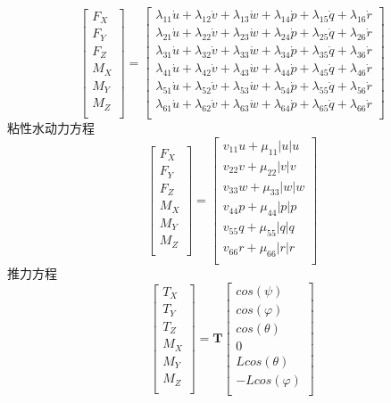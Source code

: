 \documentclass{ctexart}
\begin{document}
	\[
	\begin{bmatrix}
		F_X\\
		F_Y\\
		F_Z\\
		M_X\\
		M_Y\\
		M_Z\\
	\end{bmatrix}=
	\begin{bmatrix}
		\lambda_{11}\dot{u}+\lambda_{12}\dot{v}+\lambda_{13}\dot{w}+\lambda_{14}\dot{p}+\lambda_{15}\dot{q}+\lambda_{16}\dot{r}\\
		\lambda_{21}\dot{u}+\lambda_{22}\dot{v}+\lambda_{23}\dot{w}+\lambda_{24}\dot{p}+\lambda_{25}\dot{q}+\lambda_{26}\dot{r}\\
		\lambda_{31}\dot{u}+\lambda_{32}\dot{v}+\lambda_{33}\dot{w}+\lambda_{34}\dot{p}+\lambda_{35}\dot{q}+\lambda_{36}\dot{r}\\
		\lambda_{41}\dot{u}+\lambda_{42}\dot{v}+\lambda_{43}\dot{w}+\lambda_{44}\dot{p}+\lambda_{45}\dot{q}+\lambda_{46}\dot{r}\\
		\lambda_{51}\dot{u}+\lambda_{52}\dot{v}+\lambda_{53}\dot{w}+\lambda_{54}\dot{p}+\lambda_{55}\dot{q}+\lambda_{56}\dot{r}\\	
		\lambda_{61}\dot{u}+\lambda_{62}\dot{v}+\lambda_{63}\dot{w}+\lambda_{64}\dot{p}+\lambda_{65}\dot{q}+\lambda_{66}\dot{r}\\
	\end{bmatrix}
	\]
	粘性水动力方程
	\[
		\begin{bmatrix}
			F_X\\
			F_Y\\
			F_Z\\
			M_X\\
			M_Y\\
			M_Z\\
		\end{bmatrix}=
		\begin{bmatrix}
			v_{11}u+\mu_{11}|u|u\\
			v_{22}v+\mu_{22}|v|v\\
			v_{33}w+\mu_{33}|w|w\\
			v_{44}p+\mu_{44}|p|p\\
			v_{55}q+\mu_{55}|q|q\\
			v_{66}r+\mu_{66}|r|r\\
		\end{bmatrix}
	\]
	推力方程
	\[
		\begin{bmatrix}
			T_X\\
			T_Y\\
			T_Z\\
			M_X\\
			M_Y\\
			M_Z\\
		\end{bmatrix} = \mathbf{T}
		\begin{bmatrix}
			cos(\psi)\\
			cos(\varphi)\\
			cos(\theta)\\
			0\\
			Lcos(\theta)\\
			-Lcos(\varphi)\\
		\end{bmatrix}
	\]
\end{document}
